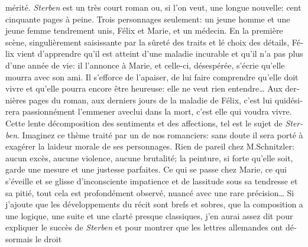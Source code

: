 \begin{ledgroupsized}[t]{13cm}
{{\begin{otherlanguage}{french}
                     mérité. \emph{Sterben} est un très court roman ou, si l’on veut, une longue nouvelle: cent
                     cinquante pages à peine. Trois personnages seulement: un jeune homme et une
                     jeune femme tendrement unis, Félix et Marie, et un médecin. En la première
                     scène, singulièrement saisissante par la sûreté des traits et lé choix des
                     détails, Félix vient d’apprendre qu’il est atteint d’une maladie incurable et
                     qu’il n’a pas plus d’une année de vie: il l’annonce à Marie, et celle-ci,
                     désespérée, s'écrie qu’elle mourra avec son ami. Il s’efforce de l’apaiser, de
                     lui faire comprendre qu’elle doit vivre et qu’elle pourra encore être heureuse:
                     elle ne veut rien entendre{\dots} Aux dernières pages du
                     roman, aux derniers jours de la maladie de Félix, c’est lui quidésirera
                     passionnément l’emmener aveclui dans la mort, c’est elle qui voudra vivre.
                     Cette lente décomposition des sentiments et des affections, tel est le sujet de
                        \emph{Sterben}. Imaginez ce thème traité par un de nos romanciers: sans doute il sera
                     porté à exagérer la laideur morale de ses personnages. Rien de pareil chez
                     M.Schnitzler: aucun excès, aucune violence, aucune brutalité; la peinture, si
                     forte qu’elle soit, garde une mesure et une justesse parfaites. Ce qui se passe
                     chez Marie, ce qui s’éveille et se glisse d’inconsciente impatience et de
                     lassitude sous sa tendresse et sa pitié, tout cela est profondément observé,
                     nuancé avec une rare précision{\dots} Si j’ajoute que les
                     développements du récit sont brefs et sobres, que la composition a une logique,
                     une suite et une clarté presque classiques, j’en aurai assez dit pour expliquer
                     le succès de \emph{Sterben} et pour montrer que les lettres allemandes ont désormais le droit

\end{otherlanguage}}}
\end{ledgroupsized}
